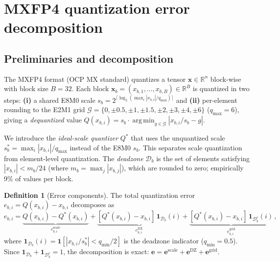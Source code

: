 \documentclass{article}
\theoremstyle{definition}
\newtheorem{definition}[theorem]{Definition}
\theoremstyle{remark}
\DeclareMathOperator*{\argmin}{arg\,min}
\newcommand{\Reals}{\mathbb{R}}
\newcommand{\Ind}{\mathbf{1}}
\newcommand{\cD}{\mathcal{D}}
\newcommand{\cG}{\mathcal{G}}
\newcommand{\bx}{\bm{x}}
\newcommand{\be}{\bm{e}}
\begin{document}
\section{MXFP4 quantization error decomposition}
\label{sec:decomposition}

\subsection{Preliminaries and decomposition}
\label{sec:prelim}

The MXFP4 format (OCP MX standard) quantizes a tensor $\bx\in\Reals^n$ block-wise with block size $B{=}32$. Each block $\bx_b = (x_{b,1},\ldots,x_{b,B})\in\Reals^B$ is quantized in two steps: \textbf{(i)} a shared E8M0 scale $s_b = 2^{\lceil\log_2(\max_i|x_{b,i}|/q_{\max})\rceil}$ and \textbf{(ii)} per-element rounding to the E2M1 grid $\cG = \{0, \pm0.5, \pm1, \pm1.5, \pm2, \pm3, \pm4, \pm6\}$ ($q_{\max}{=}6$), giving a \textit{dequantized} value $Q(x_{b,i}) = s_b \cdot \argmin_{g\in\cG} |x_{b,i}/s_b - g|$.

We introduce the \emph{ideal-scale quantizer} $Q^*$ that uses the unquantized scale $s_b^* = \max_i|x_{b,i}|/q_{\max}$ instead of the E8M0 $s_b$. This separates scale quantization from element-level quantization. The \emph{deadzone} $\cD_b$ is the set of elements satisfying $|x_{b,i}| < m_b/24$ (where $m_b = \max_j|x_{b,j}|$), which are rounded to zero; empirically 9\% of values per block.

\begin{definition}[Error components]
\label{def:error_components}
The total quantization error $e_{b,i} = Q(x_{b,i}) - x_{b,i}$ decomposes as
\begin{equation}
\label{eq:decomp}
  e_{b,i}
  = \underbrace{Q(x_{b,i}) - Q^*(x_{b,i})}_{e_{b,i}^{\mathrm{scale}}}
  + \underbrace{[Q^*(x_{b,i}) - x_{b,i}]\, \Ind_{\cD_b}(i)}_{e_{b,i}^{\mathrm{DZ}}}
  + \underbrace{[Q^*(x_{b,i}) - x_{b,i}]\, \Ind_{\cD_b^c}(i)}_{e_{b,i}^{\mathrm{grid}}}\,,
\end{equation}
where $\Ind_{\cD_b}(i) = \Ind[|x_{b,i}/s_b^*| < q_{\min}/2]$ is the deadzone indicator ($q_{\min}{=}0.5$). Since $\Ind_{\cD_b} + \Ind_{\cD_b^c} = 1$, the decomposition is exact: $\be = \be^{\mathrm{scale}} + \be^{\mathrm{DZ}} + \be^{\mathrm{grid}}$.
\end{definition}
\end{document}
